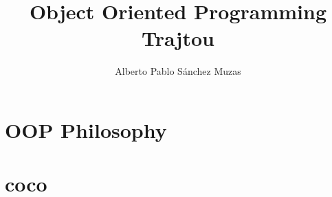 \documentclass[a4paper,12pt]{article}
\author{Alberto Pablo S\'{a}nchez Muzas}
\title{Object Oriented Programming Trajtou}
\begin{document}
\maketitle
\tableofcontents
\section{OOP Philosophy}
	
\section{coco}
\end{document}
